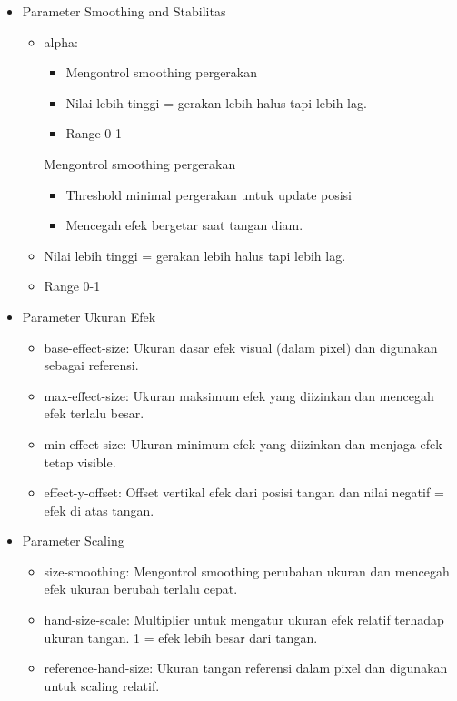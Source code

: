 \documentclass[11pt,a4paper]{article}
\begin{document}
    \begin{itemize}
        \item Parameter Smoothing and Stabilitas
        \begin{itemize}
            \item alpha: 
            \begin{itemize}
                \item Mengontrol smoothing pergerakan 
                \item Nilai lebih tinggi = gerakan lebih halus tapi lebih lag. 
                \item Range 0-1
            \end{itemize}Mengontrol smoothing pergerakan
            \begin{itemize}
                \item Threshold minimal pergerakan untuk update posisi
                \item Mencegah efek bergetar saat tangan diam.
            \end{itemize}
            \item Nilai lebih tinggi = gerakan lebih halus tapi lebih lag. 
            \item Range 0-1
        \end{itemize}
        \item Parameter Ukuran Efek
        \begin{itemize}
            \item base-effect-size: Ukuran dasar efek visual (dalam pixel) dan digunakan sebagai referensi.
            \item max-effect-size: Ukuran maksimum efek yang diizinkan dan mencegah efek terlalu besar.
            \item min-effect-size: Ukuran minimum efek yang diizinkan dan menjaga efek tetap visible.
            \item effect-y-offset: Offset vertikal efek dari posisi tangan dan nilai negatif = efek di atas tangan.
        \end{itemize}
        \item Parameter Scaling
        \begin{itemize}
            \item size-smoothing: Mengontrol smoothing perubahan ukuran dan mencegah efek ukuran berubah terlalu cepat.
            \item hand-size-scale: Multiplier untuk mengatur ukuran efek relatif terhadap ukuran tangan. 1 = efek lebih besar dari tangan.
            \item reference-hand-size: Ukuran tangan referensi dalam pixel dan digunakan untuk scaling relatif. 

\end{itemize}
\end{itemize}
\end{document}
